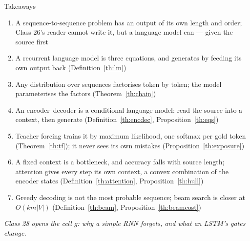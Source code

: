 \documentclass[aspectratio=169, 11pt]{beamer}
\newcommand{\bridge}[1]{%
  {\scriptsize\itshape\color{mcMuted} #1\par}\vspace{0.35em}}
\newcommand{\nosrc}{}       %
\begin{document}
\begin{frame}{Takeaways}
  \nosrc
  \vspace{-0.1em}
  {\scriptsize
  \begin{enumerate}\itemsep0.24em
    \item A sequence-to-sequence problem has an output of its own length
          and order; Class 26's reader cannot write it, but a language
          model can --- given the source first
    \item A recurrent language model is three equations, and generates
          by feeding its own output back (Definition~\ref{th:lm})
    \item Any distribution over sequences factorises token by token; the
          model parameterises the factors (Theorem~\ref{th:chain})
    \item An encoder--decoder is a conditional language model: read the
          source into a context, then generate
          (Definition~\ref{th:encdec}, Proposition~\ref{th:eqs})
    \item Teacher forcing trains it by maximum likelihood, one softmax
          per gold token (Theorem~\ref{th:tf}); it never sees its own
          mistakes (Proposition~\ref{th:exposure})
    \item A fixed context is a bottleneck, and accuracy falls with source
          length; attention gives every step its own context, a convex
          combination of the encoder states
          (Definition~\ref{th:attention}, Proposition~\ref{th:hull})
    \item Greedy decoding is not the most probable sequence; beam search
          is closer at $O(km|V|)$ (Definition~\ref{th:beam},
          Proposition~\ref{th:beamcost})
  \end{enumerate}}
  \vspace{-0.2em}
  \bridge{Class 28 opens the cell $g$: why a simple RNN forgets, and
  what an LSTM's gates change.}
\end{frame}
\end{document}
